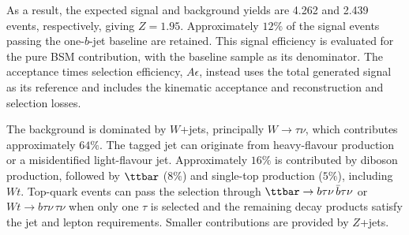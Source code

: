 \begin{table}[htbp]
    \centering
    \small
    \caption{Signal and background cutflow for $\bTagSR$-$\Res$. The signal is evaluated at $(\MU,\gU,\beta_L^{23})=(1.5~\TeV,1.5,0.6)$.}
    \label{tab:ch7_cutflow_res}
    \setlength{\tabcolsep}{3pt}
\end{table}

As a result, the expected signal and background yields are 4.262 and 2.439 events, respectively, giving $Z=1.95$.
Approximately $12\%$ of the signal events passing the one-$b$-jet baseline are retained.
This signal efficiency is evaluated for the pure BSM contribution, with the baseline sample as its denominator.
The acceptance times selection efficiency, $A\epsilon$, instead uses the total generated signal as its reference and includes the kinematic acceptance and reconstruction and selection losses.

The background is dominated by $W$+jets, principally $W\to\tau\nu$, which contributes approximately $64\%$.
The tagged jet can originate from heavy-flavour production or a misidentified light-flavour jet.
Approximately $16\%$ is contributed by diboson production, followed by $\ttbar$ ($8\%$) and single-top production ($5\%$), including $Wt$.
Top-quark events can pass the selection through $\ttbar\to b\tau\nu\,\bar b\tau\nu$ or $Wt\to b\tau\nu\,\tau\nu$ when only one $\tau$ is selected and the remaining decay products satisfy the jet and lepton requirements.
Smaller contributions are provided by $Z$+jets.

